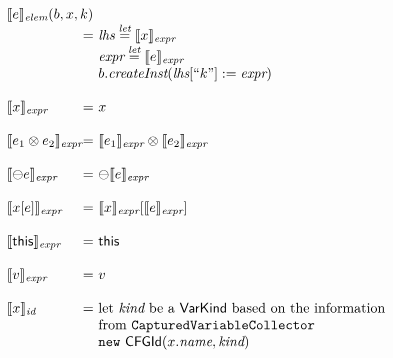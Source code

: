 \[\begin{array}{l@{}l@{~}l}
\lefteqn{\transfun{e}_{\emph{elem}}(b, x, k)}\\
& = & \emph{lhs} \letval \transfun{x}_{\emph{expr}}\\
& & \emph{expr} \letval \transfun{e}_{\emph{expr}}\\
& & b.\emph{createInst}(\emph{lhs} [``k"] := \emph{expr})\\
& & \\

\transfun{x}_{\emph{expr}} & = & x\\
& & \\

\transfun{e_1 \inop e_2}_{\emph{expr}}
& = & \transfun{e_1}_{\emph{expr}} \inop \transfun{e_2}_{\emph{expr}}\\
& & \\

\transfun{\preop e}_{\emph{expr}}
& = & \preop \transfun{e}_{\emph{expr}}\\
& & \\

\transfun{x [e]}_{\emph{expr}}
 & = & \transfun{x}_{\emph{expr}} [ \transfun{e}_{\emph{expr}} ]\\
& & \\

\transfun{\this}_{\emph{expr}} & = & \this\\
& & \\

\transfun{v}_{\emph{expr}} & = & v\\
& & \\

\transfun{x}_{\emph{id}}
& = & \text{let }\emph{kind} \text{ be a } \VarKind \text{ based on the information}\\
& & \text{from } \TT{CapturedVariableCollector}\\
& & \new\ \CFGId(x.\emph{name}, \emph{kind})\\
\end{array}
\]
